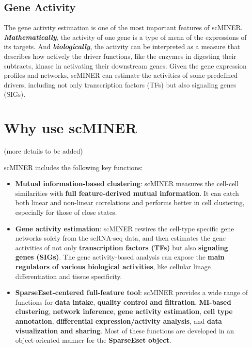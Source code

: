 \documentclass[
  12pt,
]{book}
\begin{document}
\subsection*{Gene Activity}\label{gene-activity}

The gene activity estimation is one of the most important features of scMINER. \textbf{\emph{Mathematically}}, the activity of one gene is a type of mean of the expressions of its targets. And \textbf{\emph{biologically}}, the activity can be interpreted as a measure that describes how actively the driver functions, like the enzymes in digesting their subtracts, kinase in activating their downstream genes. Given the gene expression profiles and networks, scMINER can estimate the activities of some predefined drivers, including not only transcription factors (TFs) but also signaling genes (SIGs).

\section{Why use scMINER}\label{why-use-scminer}

(more details to be added)

scMINER includes the following key functions:

\begin{itemize}
\item
  \textbf{Mutual information-based clustering}: scMINER measures the cell-cell similarities with \textbf{full feature-derived mutual information}. It can catch both linear and non-linear correlations and performs better in cell clustering, especially for those of close states.
\item
  \textbf{Gene activity estimation}: scMINER rewires the cell-type specific gene networks solely from the scRNA-seq data, and then estimates the gene activities of not only \textbf{transcription factors (TFs)} but also \textbf{signaling genes (SIGs)}. The gene activity-based analysis can expose the \textbf{main regulators of various biological activities}, like cellular linage differentiation and tissue specificity.
\item
  \textbf{SparseEset-centered full-feature tool}: scMINER provides a wide range of functions for \textbf{data intake}, \textbf{quality control and filtration}, \textbf{MI-based clustering}, \textbf{network inference}, \textbf{gene activity estimation}, \textbf{cell type annotation}, \textbf{differential expression/activity analysis}, and \textbf{data visualization and sharing}. Most of these functions are developed in an object-oriented manner for the \textbf{SparseEset object}.
\end{itemize}
\end{document}
